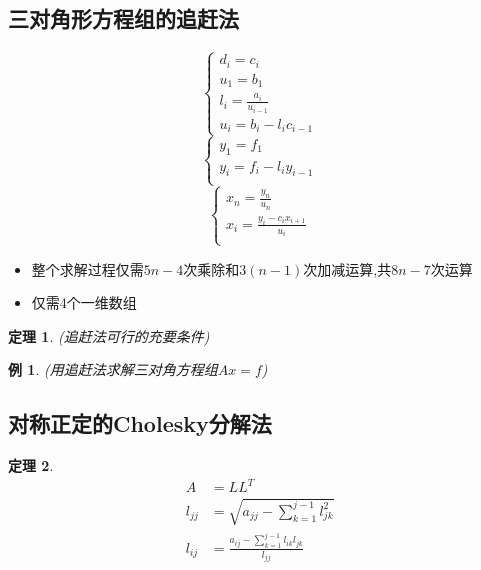 \documentclass[twoside]{article}
\newtheorem{theorem}{定理}[section]
\newtheorem{eg}{例}[section]
\begin{document}
\subsection{三对角形方程组的追赶法}
\begin{equation}
  \begin{cases}
    d_i=c_i \\
    u_1=b_1 \\
    l_i=\frac{a_i}{u_{i-1}} \\
    u_i=b_i-l_i c_{i-1}
  \end{cases}
\end{equation}
\begin{equation}
  \begin{cases}{}
    y_1=f_1\\
    y_i=f_i-l_i y_{i-1}\\
  \end{cases}
\end{equation}
\begin{equation}
  \begin{cases}{}
    x_n = \frac{y_n}{u_n} \\
    x_i = \frac{y_i-c_ix_{i+1}}{u_i}\\
  \end{cases}
\end{equation}
\begin{itemize}
  \item 整个求解过程仅需$5n-4$次乘除和$3(n-1)$次加减运算,共$8n-7$次运算
  \item 仅需$4$个一维数组
\end{itemize}
\begin{theorem}
  (追赶法可行的充要条件)
\end{theorem}
\begin{eg}
  (用追赶法求解三对角方程组$Ax=f$)
\end{eg}
\subsection{对称正定的Cholesky分解法}
\begin{theorem}
  \begin{equation}
    \begin{aligned}
      A&=LL^T \\
      l_{jj}&=\sqrt{a_{jj}-\sum^{j-1}_{k=1} l^2_{jk}}\\
      l_{ij}&=\frac{a_{ij}-\sum^{j-1}_{k=1} l_{ik} l_{jk}}{l_{jj}}
    \end{aligned}
  \end{equation}
\end{theorem}
\end{document}
